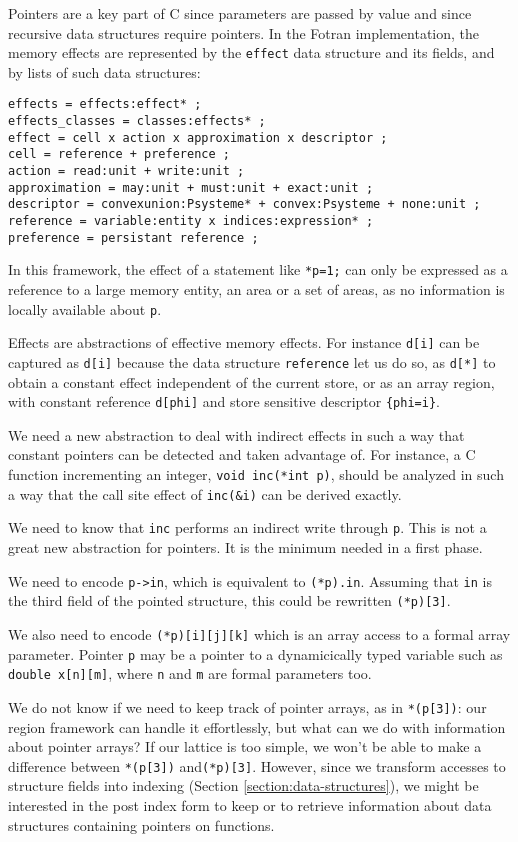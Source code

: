 \documentclass[a4paper]{report}
\begin{document}
Pointers are a key part of C since parameters are passed by value and
since recursive data structures require pointers. In the Fotran
implementation, the memory effects are represented by the
\verb/effect/ data structure and its fields, and by lists of such data
structures:

\begin{verbatim}
effects = effects:effect* ;
effects_classes = classes:effects* ;
effect = cell x action x approximation x descriptor ;
cell = reference + preference ;
action = read:unit + write:unit ;
approximation = may:unit + must:unit + exact:unit ;
descriptor = convexunion:Psysteme* + convex:Psysteme + none:unit ;
reference = variable:entity x indices:expression* ;
preference = persistant reference ;
\end{verbatim}

In this framework, the effect of a statement like \verb/*p=1;/ can
 only be expressed as a reference to a large memory
 entity, an area or a set of areas, as no information is locally
 available about \verb/p/.

Effects are abstractions of effective memory effects. For instance
\verb/d[i]/ can be captured as \verb/d[i]/ because the data structure
\verb/reference/ let us do so, as \verb/d[*]/ to obtain a constant
effect independent of the current store, or as an array region, with
constant reference \verb/d[phi]/ and store sensitive descriptor
\verb/{phi=i}/.

We need a new abstraction to deal with indirect effects in such a way
that constant pointers can be detected and taken advantage of. For
instance, a C function incrementing an integer, \verb/void inc(*int p)/,
should be analyzed in such a way that the call site effect of
\verb/inc(&i)/ can be derived exactly.

We need to know that \verb/inc/ performs an indirect write through
\verb/p/.  This is not a great new abstraction for pointers. It is the
minimum needed in a first phase.

We need to encode \verb/p->in/, which is equivalent to
 \verb/(*p).in/. Assuming that \verb/in/ is the third field of the
 pointed structure, this could be rewritten \verb/(*p)[3]/.

We also need to encode \verb/(*p)[i][j][k]/ which is an array access to
 a formal array parameter. Pointer \verb/p/ may be a pointer to a
 dynamicically typed variable such as \verb/double x[n][m]/, where
 \verb/n/ and \verb/m/ are formal parameters too.

We do not know if we need to keep track of pointer arrays, as in
 \verb/*(p[3])/: our region framework can handle it effortlessly, but
 what can we do with information about pointer arrays? If our lattice
 is too simple, we won't be able to make a difference between
 \verb/*(p[3])/ and\verb/(*p)[3]/. However, since we transform
 accesses to structure fields into indexing (Section
 \ref{section:data-structures}), we might be interested in the post
 index form to keep or to retrieve information about data structures
 containing pointers on functions.
\end{document}
